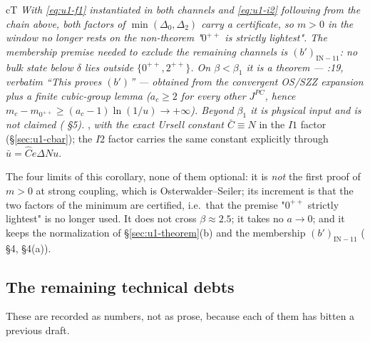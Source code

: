 \begin{claimbox}{cT}
\emph{With \eqref{eq:u1-f1} instantiated in both channels and \eqref{eq:u1-i2} following from the
chain above, both factors of $\min(\Delta_0,\Delta_2)$ carry a certificate, so $m>0$ in the
window no longer rests on the non-theorem "$0^{++}$ is strictly lightest". The membership
premise needed to exclude the remaining channels is $(b')_{\mathrm{IN-11}}$: no bulk state below
$\delta$ lies outside $\{0^{++},2^{++}\}$. On $\beta<\beta_1$ it is a theorem ---
:19, verbatim ``This proves $(b')$'' --- obtained from the convergent OS/SZZ
expansion plus a finite cubic-group lemma ($a_c\ge2$ for every other $J^{PC}$, hence
$m_c-m_{0^{++}}\ge(a_c-1)\ln(1/u)\to+\infty$). Beyond $\beta_1$ it is physical input and is
\emph{not} claimed ( \S5).} \LT{}, \emph{with the exact Ursell constant
$\bar C\equiv N$} in the $I1$ factor (\S\ref{sec:u1-cbar}); the $I2$ factor carries the same
constant explicitly through $\bar u=\hat C e\Delta N u$.
\end{claimbox}

\noindent The four limits of this corollary, none of them optional: it is \emph{not} the first
proof of $m>0$ at strong coupling, which is Osterwalder--Seiler; its increment is that the two
factors of the minimum are certified, i.e.\ that the premise "$0^{++}$ strictly lightest" is no
longer used. It does not cross $\beta\approx2.5$; it takes no $a\to0$; and it keeps the
normalization of \S\ref{sec:u1-theorem}(b) and the membership $(b')_{\mathrm{IN-11}}$
( \S4,  \S4(a)).

\subsection{The remaining technical debts}
\label{sec:u1-ledger}

\noindent These are recorded as numbers, not as prose, because each of them has bitten a previous
draft.

